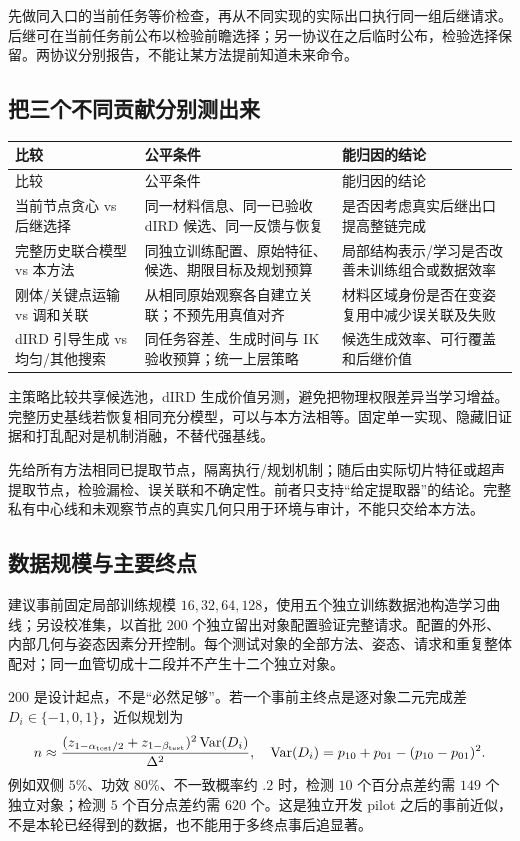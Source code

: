 \documentclass[11pt,a4paper,fontset=fandol]{ctexart}
\theoremstyle{definition}
\theoremstyle{remark}\newtheorem{remark}[theorem]{说明}
\numberwithin{equation}{section}
\begin{document}
先做同入口的当前任务等价检查，再从不同实现的实际出口执行同一组后继请求。后继可在当前任务前公布以检验前瞻选择；另一协议在之后临时公布，检验选择保留。两协议分别报告，不能让某方法提前知道未来命令。

\subsection{把三个不同贡献分别测出来}
\begin{longtable}{P{.23\linewidth}P{.35\linewidth}P{.32\linewidth}}
\toprule 比较 & 公平条件 & 能归因的结论\\\midrule
\endfirsthead
\toprule 比较 & 公平条件 & 能归因的结论\\\midrule
\endhead
当前节点贪心 vs 后继选择 & 同一材料信息、同一已验收 dIRD 候选、同一反馈与恢复 & 是否因考虑真实后继出口提高整链完成\\
完整历史联合模型 vs 本方法 & 同独立训练配置、原始特征、候选、期限目标及规划预算 & 局部结构表示/学习是否改善未训练组合或数据效率\\
刚体/关键点运输 vs 调和关联 & 从相同原始观察各自建立关联；不预先用真值对齐 & 材料区域身份是否在变姿复用中减少误关联及失败\\
dIRD 引导生成 vs 均匀/其他搜索 & 同任务容差、生成时间与 IK 验收预算；统一上层策略 & 候选生成效率、可行覆盖和后继价值\\
\bottomrule
\end{longtable}
主策略比较共享候选池，dIRD 生成价值另测，避免把物理权限差异当学习增益。完整历史基线若恢复相同充分模型，可以与本方法相等。固定单一实现、隐藏旧证据和打乱配对是机制消融，不替代强基线。

先给所有方法相同已提取节点，隔离执行/规划机制；随后由实际切片特征或超声提取节点，检验漏检、误关联和不确定性。前者只支持“给定提取器”的结论。完整私有中心线和未观察节点的真实几何只用于环境与审计，不能只交给本方法。

\subsection{数据规模与主要终点}
建议事前固定局部训练规模 $16,32,64,128$，使用五个独立训练数据池构造学习曲线；另设校准集，以首批 $200$ 个独立留出对象配置验证完整请求。配置的外形、内部几何与姿态因素分开控制。每个测试对象的全部方法、姿态、请求和重复整体配对；同一血管切成十二段并不产生十二个独立对象。

$200$ 是设计起点，不是“必然足够”。若一个事前主终点是逐对象二元完成差 $D_i\in\{-1,0,1\}$，近似规划为
\begin{equation}
 n\approx
 \frac{(z_{1-\alpha_{\rm test}/2}+z_{1-\beta_{\rm test}})^2
 \operatorname{Var}(D_i)}{\Delta^2},
 \quad
 \operatorname{Var}(D_i)=p_{10}+p_{01}-(p_{10}-p_{01})^2.
\end{equation}
例如双侧 $5\%$、功效 $80\%$、不一致概率约 $.2$ 时，检测 $10$ 个百分点差约需 $149$ 个独立对象；检测 $5$ 个百分点差约需 $620$ 个。这是独立开发 pilot 之后的事前近似，不是本轮已经得到的数据，也不能用于多终点事后追显著。
\end{document}
